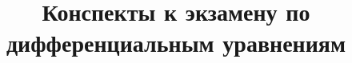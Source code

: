 \documentclass{article}
\title{Конспекты к экзамену по дифференциальным уравнениям}
\begin{document}
\maketitle
\vfill
\tableofcontents





\end{document}
